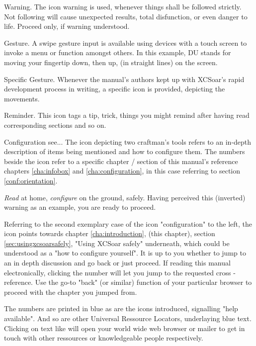 \warning Warning. The icon warning is used, whenever things shall be followed 
strictly.  Not following will cause unexpected results, total disfunction, or 
even danger to life. Proceed only, if warning understood.

 Gesture. A swipe gesture input is available using devices with a 
touch screen to invoke a menu or function amongst others. In this example, DU 
stands for moving your fingertip down, then up, (in straight lines) on the 
screen.
  
 Specific Gesture. Whenever the manual's authors kept up with XCSoar's rapid development process
in writing, a specific icon is provided, depicting the movements.

\tip Reminder. This icon tags a tip, trick, things you might remind after having read corresponding sections and so on.

 Configuration see... The icon depicting two craftman's 
tools refers to an in-depth description of items being mentioned and how to 
configure them. The numbers beside the icon refer to a specific chapter / 
section of this manual's reference chapters \ref{cha:infobox} and 
\ref{cha:configuration}, in this case referring to section 
\ref{conf:orientation}. 


\emph{Read} at home, \emph{configure} on the ground, safely. Having perceived 
this (inverted) warning as an example, you are ready to proceed.

 Referring to the second exemplary case of the icon 
"configuration" to the left, the icon points 
towards chapter \ref{cha:introduction}, (this chapter), section 
\ref{sec:usingxcsoarsafely}, "Using XCSoar safely" underneath, which could be 
understood as a "how to configure yourself". It is up to you whether to jump 
to an in depth discussion and go back or just proceed. If reading this manual 
electronically, clicking the number will let you jump to the requested cross
-reference.  Use the go-to "back" (or similar) function of your particular 
browser to proceed with the chapter you jumped from.

The numbers are printed in blue as are the icons introduced, signalling "help 
available". And so are other Universal Ressource Locators, underlaying blue 
text. Clicking on text like  will open your world wide 
web browser or mailer to get in touch with other ressources or knowledgeable 
people respectively.

